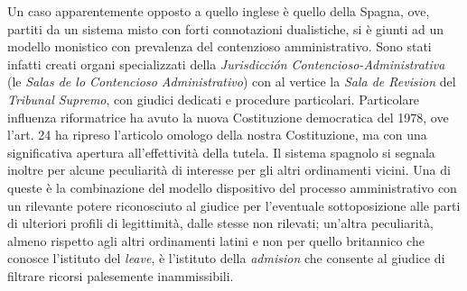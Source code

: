 \documentclass[12pt,it,a4paper,]{report}
\begin{document}
Un caso apparentemente opposto a quello inglese è quello della Spagna,
ove, partiti da un sistema misto con forti connotazioni dualistiche, si
è giunti ad un modello monistico con prevalenza del contenzioso
amministrativo. Sono stati infatti creati organi specializzati della
\emph{Jurisdicción Contencioso-Administrativa} (le \emph{Salas de lo
Contencioso Administrativo}) con al vertice la \emph{Sala de Revision}
del \emph{Tribunal Supremo}, con giudici dedicati e procedure
particolari. Particolare influenza riformatrice ha avuto la nuova
Costituzione democratica del 1978, ove l'art. 24 ha ripreso l'articolo
omologo della nostra Costituzione, ma con una significativa apertura
all'effettività della tutela. Il sistema spagnolo si segnala inoltre per
alcune peculiarità di interesse per gli altri ordinamenti vicini. Una di
queste è la combinazione del modello dispositivo del processo
amministrativo con un rilevante potere riconosciuto al giudice per
l'eventuale sottoposizione alle parti di ulteriori profili di
legittimità, dalle stesse non rilevati; un'altra peculiarità, almeno
rispetto agli altri ordinamenti latini e non per quello britannico che
conosce l'istituto del \emph{leave}, è l'istituto della \emph{admision}
che consente al giudice di filtrare ricorsi palesemente inammissibili.
\end{document}
